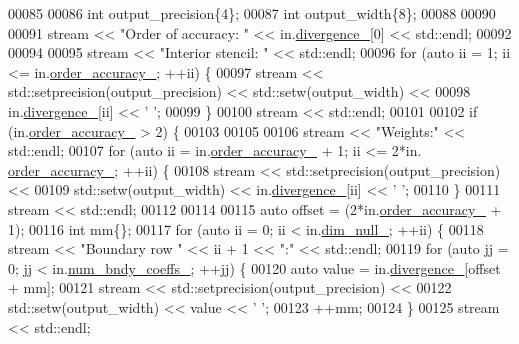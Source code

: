 \begin{DoxyCode}
00085 
00086   \textcolor{keywordtype}{int} output\_precision\{4\};
00087   \textcolor{keywordtype}{int} output\_width\{8\};
00088 
00090 
00091   stream << \textcolor{stringliteral}{"Order of accuracy: "} << in.\hyperlink{classmtk_1_1Div1D_a0f96410051ba1fa6d91dfa7b7eacead9}{divergence\_}[0] << std::endl;
00092 
00094 
00095   stream << \textcolor{stringliteral}{"Interior stencil: "} << std::endl;
00096   \textcolor{keywordflow}{for} (\textcolor{keyword}{auto} ii = 1; ii <= in.\hyperlink{classmtk_1_1Div1D_a9c8a8d7cd08a72dbd1daa8deee06f9c6}{order\_accuracy\_}; ++ii) \{
00097     stream << std::setprecision(output\_precision) << std::setw(output\_width) <<
00098       in.\hyperlink{classmtk_1_1Div1D_a0f96410051ba1fa6d91dfa7b7eacead9}{divergence\_}[ii] << \textcolor{charliteral}{' '};
00099   \}
00100   stream << std::endl;
00101 
00102   \textcolor{keywordflow}{if} (in.\hyperlink{classmtk_1_1Div1D_a9c8a8d7cd08a72dbd1daa8deee06f9c6}{order\_accuracy\_} > 2) \{
00103 
00105 
00106     stream << \textcolor{stringliteral}{"Weights:"} << std::endl;
00107     \textcolor{keywordflow}{for} (\textcolor{keyword}{auto} ii = in.\hyperlink{classmtk_1_1Div1D_a9c8a8d7cd08a72dbd1daa8deee06f9c6}{order\_accuracy\_} + 1; ii <= 2*in.
      \hyperlink{classmtk_1_1Div1D_a9c8a8d7cd08a72dbd1daa8deee06f9c6}{order\_accuracy\_}; ++ii) \{
00108       stream << std::setprecision(output\_precision) <<
00109         std::setw(output\_width) << in.\hyperlink{classmtk_1_1Div1D_a0f96410051ba1fa6d91dfa7b7eacead9}{divergence\_}[ii] << \textcolor{charliteral}{' '};
00110     \}
00111     stream << std::endl;
00112 
00114 
00115     \textcolor{keyword}{auto} offset = (2*in.\hyperlink{classmtk_1_1Div1D_a9c8a8d7cd08a72dbd1daa8deee06f9c6}{order\_accuracy\_} + 1);
00116     \textcolor{keywordtype}{int} mm\{\};
00117     \textcolor{keywordflow}{for} (\textcolor{keyword}{auto} ii = 0; ii < in.\hyperlink{classmtk_1_1Div1D_a264027144def76d802778391f55381a0}{dim\_null\_}; ++ii) \{
00118       stream << \textcolor{stringliteral}{"Boundary row "} << ii + 1 << \textcolor{stringliteral}{":"} << std::endl;
00119       \textcolor{keywordflow}{for} (\textcolor{keyword}{auto} jj = 0; jj < in.\hyperlink{classmtk_1_1Div1D_a717240b41eaa2adde858630b9e3d3042}{num\_bndy\_coeffs\_}; ++jj) \{
00120         \textcolor{keyword}{auto} value = in.\hyperlink{classmtk_1_1Div1D_a0f96410051ba1fa6d91dfa7b7eacead9}{divergence\_}[offset + mm];
00121         stream << std::setprecision(output\_precision) <<
00122           std::setw(output\_width) << value << \textcolor{charliteral}{' '};
00123         ++mm;
00124       \}
00125       stream << std::endl;

\end{DoxyCode}
